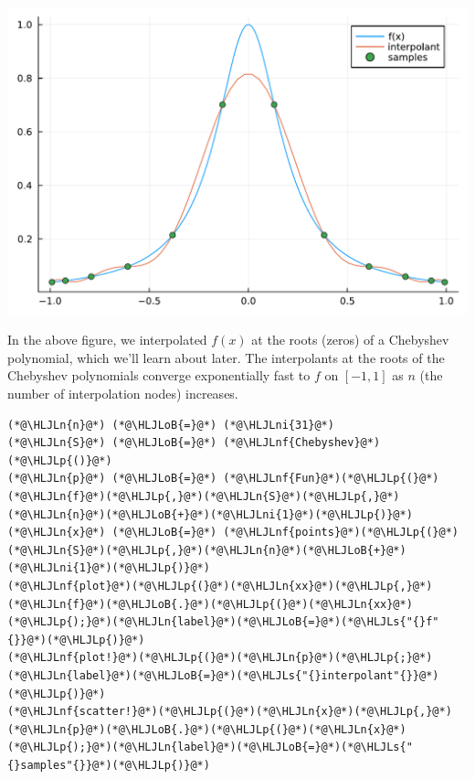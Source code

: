 \documentclass[12pt,a4paper]{article}
\newcommand{\HLJLn}[1]{#1}
\newcommand{\HLJLnf}[1]{\textcolor[RGB]{66,102,213}{#1}}
\newcommand{\HLJLs}[1]{\textcolor[RGB]{201,61,57}{#1}}
\newcommand{\HLJLni}[1]{\textcolor[RGB]{59,151,46}{#1}}
\newcommand{\HLJLoB}[1]{\textcolor[RGB]{102,102,102}{\textbf{#1}}}
\newcommand{\HLJLp}[1]{#1}
\begin{document}
\includegraphics[width=\linewidth]{jl_P71Faz/Chapter3_3_1.pdf}

In the above figure, we interpolated $f(x)$ at the roots (zeros) of a Chebyshev polynomial, which we'll learn about later.  The interpolants at the roots of the Chebyshev polynomials converge exponentially fast to $f$ on $[-1, 1]$ as $n$ (the number of interpolation nodes) increases.


\begin{lstlisting}
(*@\HLJLn{n}@*) (*@\HLJLoB{=}@*) (*@\HLJLni{31}@*)
(*@\HLJLn{S}@*) (*@\HLJLoB{=}@*) (*@\HLJLnf{Chebyshev}@*)(*@\HLJLp{()}@*)
(*@\HLJLn{p}@*) (*@\HLJLoB{=}@*) (*@\HLJLnf{Fun}@*)(*@\HLJLp{(}@*)(*@\HLJLn{f}@*)(*@\HLJLp{,}@*)(*@\HLJLn{S}@*)(*@\HLJLp{,}@*)(*@\HLJLn{n}@*)(*@\HLJLoB{+}@*)(*@\HLJLni{1}@*)(*@\HLJLp{)}@*) 
(*@\HLJLn{x}@*) (*@\HLJLoB{=}@*) (*@\HLJLnf{points}@*)(*@\HLJLp{(}@*)(*@\HLJLn{S}@*)(*@\HLJLp{,}@*)(*@\HLJLn{n}@*)(*@\HLJLoB{+}@*)(*@\HLJLni{1}@*)(*@\HLJLp{)}@*) 
(*@\HLJLnf{plot}@*)(*@\HLJLp{(}@*)(*@\HLJLn{xx}@*)(*@\HLJLp{,}@*)(*@\HLJLn{f}@*)(*@\HLJLoB{.}@*)(*@\HLJLp{(}@*)(*@\HLJLn{xx}@*)(*@\HLJLp{);}@*)(*@\HLJLn{label}@*)(*@\HLJLoB{=}@*)(*@\HLJLs{"{}f"{}}@*)(*@\HLJLp{)}@*)
(*@\HLJLnf{plot!}@*)(*@\HLJLp{(}@*)(*@\HLJLn{p}@*)(*@\HLJLp{;}@*)(*@\HLJLn{label}@*)(*@\HLJLoB{=}@*)(*@\HLJLs{"{}interpolant"{}}@*)(*@\HLJLp{)}@*)
(*@\HLJLnf{scatter!}@*)(*@\HLJLp{(}@*)(*@\HLJLn{x}@*)(*@\HLJLp{,}@*)(*@\HLJLn{p}@*)(*@\HLJLoB{.}@*)(*@\HLJLp{(}@*)(*@\HLJLn{x}@*)(*@\HLJLp{);}@*)(*@\HLJLn{label}@*)(*@\HLJLoB{=}@*)(*@\HLJLs{"{}samples"{}}@*)(*@\HLJLp{)}@*)
\end{lstlisting}
\end{document}
